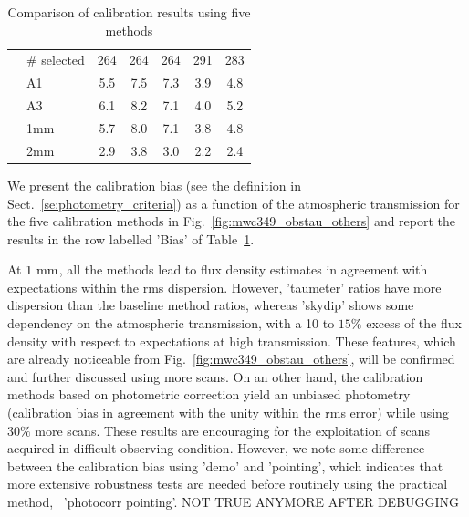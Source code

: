 \begin{table}[th]
\begin{center}
\begin{tabular}{|c|l|c|c|c|c|c|}
       &  $\#$ selected &   264    &    264   &    264    &    291    &  283 \\
       &  A1            &   5.5    &    7.5   &    7.3    &    3.9    &  4.8 \\
       &  A3            &   6.1    &    8.2   &    7.1    &    4.0    &  5.2 \\
       &  1mm           &   5.7    &    8.0   &    7.1    &    3.8    &  4.8 \\
       &  2mm           &   2.9    &    3.8   &    3.0    &    2.2    &  2.4 \\
\hline\hline
\end{tabular}
\caption[Comparison of calibration results using five methods]{Comparison of calibration results using five methods}
\label{tab:Calibration_results_all}
\end{center}
\end{table}

We present the calibration bias (see the definition in
Sect.~\ref{se:photometry_criteria}) as a function of the atmospheric
transmission for the five calibration methods in
Fig.~\ref{fig:mwc349_obstau_others} and report the results in the row
labelled 'Bias' of Table~\ref{tab:Calibration_results_all}. 

At $1~\rm{mm}$, all the methods lead to flux density estimates in
agreement with expectations within the rms dispersion. However,
'taumeter' ratios have more dispersion than the baseline method
ratios, whereas 'skydip' shows some dependency on the atmospheric
transmission, with a 10 to $15\%$ excess of the flux density with
respect to expectations at high transmission. These features, which are
already noticeable from Fig.~\ref{fig:mwc349_obstau_others}, will be
confirmed and further discussed using more scans. On an other hand,
the calibration methods based on photometric correction yield an
unbiased photometry (calibration bias in agreement with the unity
within the rms error) while using $30\%$ more scans. These results are
encouraging for the exploitation of scans acquired in difficult
observing condition. {\color{magenta} However, we note some difference between the
calibration bias using 'demo' and 'pointing', which indicates that
more extensive robustness tests are needed before routinely using the
practical method, \aka\ 'photocorr pointing'. NOT TRUE ANYMORE AFTER DEBUGGING}   


